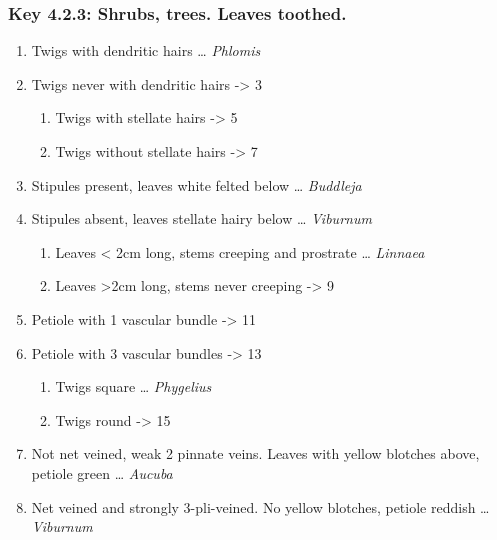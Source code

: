 \documentclass[openany]{book}
\providecommand{\tightlist}{%
  \setlength{\itemsep}{0pt}\setlength{\parskip}{0pt}}
\begin{document}
\hypertarget{key-4.2.3-shrubs-trees.-leaves-toothed.}{%
\subsubsection{Key 4.2.3: Shrubs, trees. Leaves
toothed.}\label{key-4.2.3-shrubs-trees.-leaves-toothed.}}

\begin{enumerate}
\def\labelenumi{\arabic{enumi}.}
\tightlist
\item
  Twigs with dendritic hairs \ldots{} \emph{Phlomis}
\item
  Twigs never with dendritic hairs -\textgreater{} 3

  \begin{enumerate}
  \def\labelenumii{\arabic{enumii}.}
  \setcounter{enumii}{2}
  \tightlist
  \item
    Twigs with stellate hairs -\textgreater{} 5
  \item
    Twigs without stellate hairs -\textgreater{} 7
  \end{enumerate}
\item
  Stipules present, leaves white felted below \ldots{} \emph{Buddleja}
\item
  Stipules absent, leaves stellate hairy below \ldots{} \emph{Viburnum}

  \begin{enumerate}
  \def\labelenumii{\arabic{enumii}.}
  \setcounter{enumii}{6}
  \tightlist
  \item
    Leaves \textless{} 2cm long, stems creeping and prostrate \ldots{}
    \emph{Linnaea}
  \item
    Leaves \textgreater{}2cm long, stems never creeping -\textgreater{}
    9
  \end{enumerate}
\item
  Petiole with 1 vascular bundle -\textgreater{} 11
\item
  Petiole with 3 vascular bundles -\textgreater{} 13

  \begin{enumerate}
  \def\labelenumii{\arabic{enumii}.}
  \setcounter{enumii}{10}
  \tightlist
  \item
    Twigs square \ldots{} \emph{Phygelius}
  \item
    Twigs round -\textgreater{} 15
  \end{enumerate}
\item
  Not net veined, weak 2 pinnate veins. Leaves with yellow blotches
  above, petiole green \ldots{} \emph{Aucuba}
\item
  Net veined and strongly 3-pli-veined. No yellow blotches, petiole
  reddish \ldots{} \emph{Viburnum}


\end{enumerate}
\end{document}
